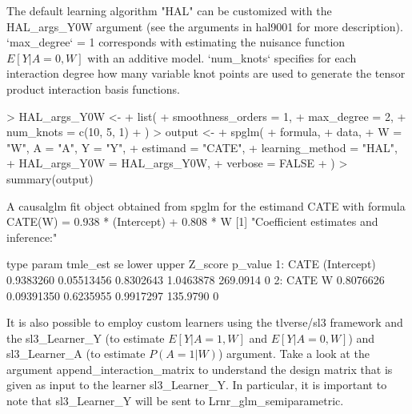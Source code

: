\documentclass{article}
\begin{document}
The default learning algorithm "HAL" can be customized with the HAL\_args\_Y0W argument (see the arguments in hal9001 for more description). `max\_degree` = 1 corresponds with estimating the nuisance function $E[Y|A=0,W]$ with an additive model. `num\_knots` specifies for each interaction degree how many variable knot points are used to generate the tensor product interaction basis functions. 

\begin{Schunk}
\begin{Sinput}
> HAL_args_Y0W <-
+   list(
+     smoothness_orders = 1,
+     max_degree = 2,
+     num_knots = c(10, 5, 1)
+   )
> output <-
+   spglm(
+     formula,
+     data,
+     W = "W", A = "A", Y = "Y",
+     estimand = "CATE",
+     learning_method = "HAL",
+     HAL_args_Y0W = HAL_args_Y0W,
+     verbose = FALSE
+   )
> summary(output)
\end{Sinput}
\begin{Soutput}
A causalglm fit object obtained from spglm for the estimand CATE with formula 
CATE(W) = 0.938 * (Intercept) + 0.808 * W
[1] "Coefficient estimates and inference:"

   type       param  tmle_est         se     lower     upper  Z_score p_value
1: CATE (Intercept) 0.9383260 0.05513456 0.8302643 1.0463878 269.0914       0
2: CATE           W 0.8076626 0.09391350 0.6235955 0.9917297 135.9790       0
\end{Soutput}
\end{Schunk}

It is also possible to employ custom learners using the tlverse/sl3 framework and the sl3\_Learner\_Y (to estimate $E[Y|A=1,W]$ and $E[Y|A=0,W]$) and sl3\_Learner\_A (to estimate $P(A=1|W)$) argument.
Take a look at the argument append\_interaction\_matrix to understand the design matrix that is given as input to the learner sl3\_Learner\_Y. In particular, it is important to note that sl3\_Learner\_Y will be sent to Lrnr\_glm\_semiparametric.
\end{document}
